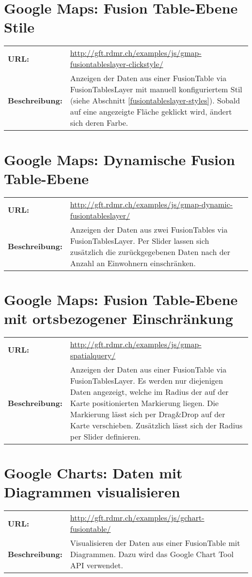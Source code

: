 \section{Google Maps: Fusion Table-Ebene Stile}
\begin{tabular}{p{0.2\twocelltabwidth}p{0.8\twocelltabwidth}}
\textbf{URL:} & \url{http://gft.rdmr.ch/examples/js/gmap-fusiontableslayer-clickstyle/} \\ 
\textbf{Beschreibung:} & Anzeigen der Daten aus einer FusionTable via FusionTablesLayer mit manuell konfiguriertem Stil (siehe Abschnitt \ref{fusiontableslayer-styles}). Sobald auf eine angezeigte Fläche geklickt wird, ändert sich deren Farbe. \\ 
\end{tabular} 

\section{Google Maps: Dynamische Fusion Table-Ebene}
\begin{tabular}{p{0.2\twocelltabwidth}p{0.8\twocelltabwidth}}
\textbf{URL:} & \url{http://gft.rdmr.ch/examples/js/gmap-dynamic-fusiontableslayer/} \\ 
\textbf{Beschreibung:} & Anzeigen der Daten aus zwei FusionTables via FusionTablesLayer. Per Slider lassen sich zusätzlich die zurückgegebenen Daten nach der Anzahl an Einwohnern einschränken.  \\ 
\end{tabular} 

\section{Google Maps: Fusion Table-Ebene mit ortsbezogener Einschränkung}
\begin{tabular}{p{0.2\twocelltabwidth}p{0.8\twocelltabwidth}}
\textbf{URL:} & \url{http://gft.rdmr.ch/examples/js/gmap-spatialquery/} \\ 
\textbf{Beschreibung:} & Anzeigen der Daten aus einer FusionTable via FusionTablesLayer. Es werden nur diejenigen Daten angezeigt, welche im Radius der auf der Karte positionierten Markierung liegen. Die Markierung lässt sich per Drag{\&}Drop auf der Karte verschieben. Zusätzlich lässt sich der Radius per Slider definieren. \\ 
\end{tabular} 

\section{Google Charts: Daten mit Diagrammen visualisieren}
\begin{tabular}{p{0.2\twocelltabwidth}p{0.8\twocelltabwidth}}
\textbf{URL:} & \url{http://gft.rdmr.ch/examples/js/gchart-fusiontable/} \\ 
\textbf{Beschreibung:} & Visualisieren der Daten aus einer FusionTable mit Diagrammen. Dazu wird das Google Chart Tool API verwendet. \\ 
\end{tabular} 

